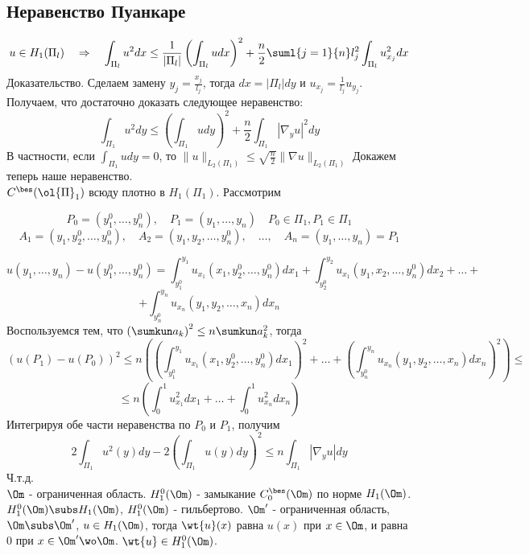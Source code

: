 \documentclass[a4paper,draft]{article}
\begin{document}
\subsection{Неравенство Пуанкаре}
$$
u\in H_1(\Pi_l)\quad\Rightarrow\quad \int_{\Pi_l}u^2dx\le
\frac{1}{|\Pi_l|}\left(\int_{\Pi_l}udx\right)^2+\frac{n}{2}\suml{j=1}{n}l_j^2\int_{\Pi_l}u_{x_j}^2dx
$$
Доказательство. Сделаем замену $y_j=\frac{x_j}{l_j}$, тогда
$dx=|\Pi_l|dy$ и $u_{x_j}=\frac{1}{l_j}u_{y_j}$. Получаем, что
достаточно доказать следующее неравенство:
$$
\int_{\Pi_1}u^2dy\le\left(\int_{\Pi_1}udy\right)^2+\frac{n}{2}\int_{\Pi_1}|\nabla_yu|^2dy
$$
В частности, если $\int_{\Pi_1}udy=0$, то $\|u\|_{L_2(\Pi_1)}\le
\sqrt{\frac{n}{2}}\|\nabla u\|_{L_2(\Pi_1)}$ Докажем теперь наше
неравенство.\\
$C^{\bes}(\ol{\Pi}_1)$ всюду плотно в $H_1(\Pi_1)$. Рассмотрим

$$P_0=(y_1^0,\ldots,y_n^0), \quad P_1=(y_1,\ldots,y_n) \quad P_0\in\Pi_1, P_1\in\Pi_1$$
$$A_1=(y_1,y_2^0,\ldots,y_n^0), \quad A_2=(y_1,y_2,\ldots,y_n^0), \quad\ldots ,\quad A_n=(y_1,\ldots,y_n)=P_1$$

$$
u(y_1,\ldots,y_n)-u(y_1^0,\ldots,y_n^0)=\int_{y_1^0}^{y_1}u_{x_1}(x_1,y_2^0,\ldots,y_n^0)dx_1+
\int_{y_2^0}^{y_2}u_{x_1}(y_1,x_2,\ldots,y_n^0)dx_2+\ldots+
$$
$$
+\int_{y_n^0}^{y_n}u_{x_n}(y_1,y_2,\ldots,x_n)dx_n
$$
Воспользуемся тем, что $\left(\sumkun  a_k\right)^2\le
n\sumkun a_k^2$, тогда
$$
(u(P_1)-u(P_0))^2\le
n\left(\left(\int_{y_1^0}^{y_1}u_{x_1}(x_1,y_2^0,\ldots,y_n^0)dx_1\right)^2+\ldots+\left(\int_{y_n^0}^{y_n}u_{x_n}(y_1,y_2,\ldots,x_n)dx_n\right)^2\right)\le
$$
$$
\le
n\left(\int_0^1u_{x_1}^2dx_1+\ldots+\int_0^1u_{x_n}^2dx_n\right)
$$
Интегрируя обе части неравенства по $P_0$ и $P_1$, получим
$$
2\int_{\Pi_1}u^2(y)dy-2\left(\int_{\Pi_1}u(y)dy\right)^2\le
n\int_{\Pi_1}|\nabla_yu|dy
$$
Ч.т.д.\\
$\Om$ - ограниченная область. $H_1^0(\Om)$ - замыкание
$C_0^{\bes}(\Om)$ по норме $H_1(\Om)$.\\
$H_1^0(\Om)\subs H_1(\Om)$, $H_1^0(\Om)$ - гильбертово.
$\Om'$ - ограниченная область, $\Om\subs \Om'$, $u\in
H_1(\Om)$, тогда $\wt{u}(x)$ равна $u(x)$ при $x\in\Om$,
и равна 0 при $x\in \Om'\wo\Om$. $\wt{u}\in
H_1^0(\Om)$.
\end{document}
